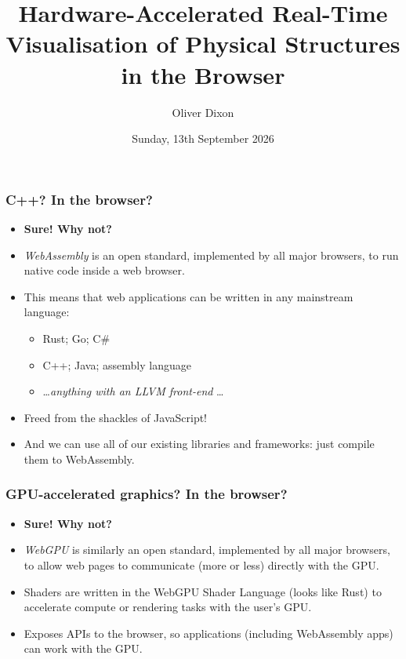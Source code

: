 \documentclass[aspectratio=169]{beamer}
\title[HW-Accelerated Browser Graphics]%
    {Hardware-Accelerated Real-Time Visualisation of Physical Structures in %
    the Browser}
\author{Oliver Dixon}
\institute[]{Department of Computer Science, University of York}
\date{Sunday, 13th September 2026}
\begin{document}
\frame{\titlepage}

\begin{frame}
    \frametitle{C++? In the browser?}
    \begin{itemize}
        \item \textbf{Sure! Why not?}
        \item \emph{WebAssembly} is an open standard, implemented by all major
            browsers, to run native code inside a web browser.
        \item This means that web applications can be written in any mainstream
            language:
            \begin{itemize}
                \item Rust; Go; C\#
                \item C++; Java; assembly language
                \item \ldots \emph{anything with an LLVM front-end} \ldots
            \end{itemize}
        \item Freed from the shackles of JavaScript!
        \item And we can use all of our existing libraries and frameworks:
            just compile them to WebAssembly.
    \end{itemize}
\end{frame}

\begin{frame}
    \frametitle{GPU-accelerated graphics? In the browser?}
    \begin{itemize}
        \item \textbf{Sure! Why not?}
        \item \emph{WebGPU} is similarly an open standard, implemented by all
            major browsers, to allow web pages to communicate (more or less)
            directly with the GPU.
        \item Shaders are written in the WebGPU Shader Language (looks like
            Rust) to accelerate compute or rendering tasks with the user's GPU.
        \item Exposes APIs to the browser, so applications (including
            WebAssembly apps) can work with the GPU.
    \end{itemize}
    \vfill\centering%
\end{frame}
\end{document}
